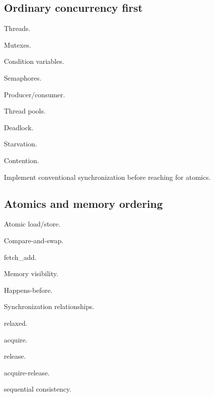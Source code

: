 \documentclass[11pt,letterpaper]{article}
\begin{document}
\subsection*{Ordinary concurrency first}

\begin{topics}

\item Threads.

\item Mutexes.

\item Condition variables.

\item Semaphores.

\item Producer/consumer.

\item Thread pools.

\item Deadlock.

\item Starvation.

\item Contention.

\end{topics}

Implement conventional synchronization before reaching for atomics.

\subsection*{Atomics and memory ordering}

\begin{topics}

\item Atomic load/store.

\item Compare-and-swap.

\item fetch\_add.

\item Memory visibility.

\item Happens-before.

\item Synchronization relationships.

\item relaxed.

\item acquire.

\item release.

\item acquire-release.

\item sequential consistency.

\end{topics}
\end{document}
